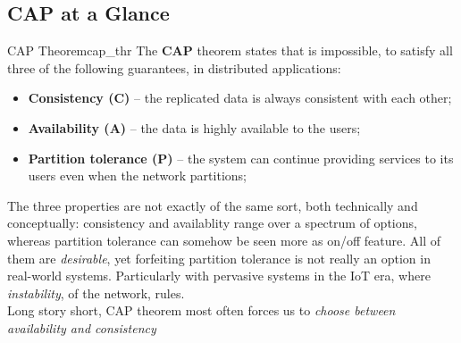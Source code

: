 \documentclass[11pt, a4paper]{article}
\begin{document}
\subsection{CAP at a Glance}\label{sub:cap_at_a_glance} %
\begin{theorem}{CAP Theorem}{cap_thr}
    The \textbf{CAP} theorem states that is impossible, to satisfy all three of the following guarantees, in distributed applications:
    \begin{itemize}
        \item \textbf{Consistency (C)} -- the replicated data is always consistent with each other;
        \item \textbf{Availability (A)} -- the data is highly available to the users;
        \item \textbf{Partition tolerance (P)} -- the system can continue providing services to its users even when the network partitions;
    \end{itemize}
\end{theorem}
%
\begin{note}
    The three properties are not exactly of the same sort, both technically and conceptually: consistency and availablity range over a spectrum of options, whereas partition tolerance can somehow be seen more as on/off feature.
All of them are \textit{desirable}, yet forfeiting partition tolerance is not really an option in real-world systems.
Particularly with pervasive systems in the IoT era, where \textit{instability}, of the network, rules.
\\
Long story short, CAP theorem most often forces us to \textit{choose between availability and consistency}
\end{note}
%
\end{document}
